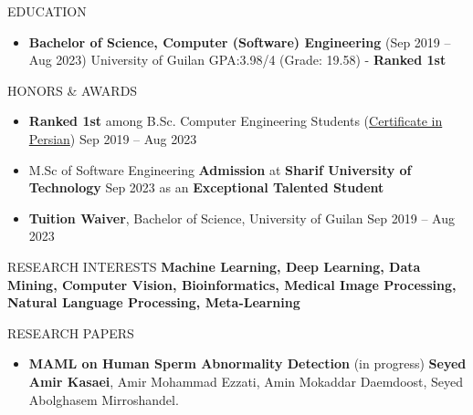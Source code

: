 \documentclass[]{CV}
\begin{document}
\resumeheader
{}
{}
{}
{}


\vspace{-4mm}
\begin{flushright}
\end{flushright}

\vspace{-7mm}
\begin{section}{EDUCATION}
\begin{itemize}
\item \textbf{Bachelor of Science, Computer (Software) Engineering} \hfill (Sep 2019 -- Aug 2023)\newline
{University of Guilan \newline GPA:3.98/4 (Grade: 19.58) - \textbf{Ranked 1st}}
\end{itemize}
\end{section}

\vspace{-2mm}
\begin{section}{HONORS \& AWARDS}
\begin{itemize}
\item \textbf{Ranked 1st} among B.Sc. Computer Engineering Students (\href{https://drive.google.com/file/d/1RfuN4xRnWvJ53gFADrlBrSxIEHqgPVWS/view?usp=sharing}{Certificate in Persian}) \hfill Sep 2019 -- Aug 2023 

\item M.Sc of Software Engineering \textbf{Admission} at \textbf{Sharif University of Technology} \hfill Sep 2023
\newline as an \textbf{Exceptional Talented Student} 

\item \textbf{Tuition Waiver}, Bachelor of Science, University of Guilan \hfill Sep 2019 -- Aug 2023 
\end{itemize}
\end{section}
\begin{section}{RESEARCH INTERESTS}
    \textbf{Machine Learning, Deep Learning, Data Mining, Computer Vision, Bioinformatics, Medical Image Processing, Natural Language Processing,  Meta-Learning}
\end{section}
\vspace{-2mm}
\begin{section}{RESEARCH PAPERS}
\begin{itemize}
\item \textbf{MAML on Human Sperm Abnormality Detection} \hfill (in progress)\newline
\textbf{Seyed Amir Kasaei}, Amir Mohammad  Ezzati, Amin Mokaddar Daemdoost, Seyed Abolghasem Mirroshandel.
\end{itemize}
\end{section}
\vspace{-2mm}
\end{document}
